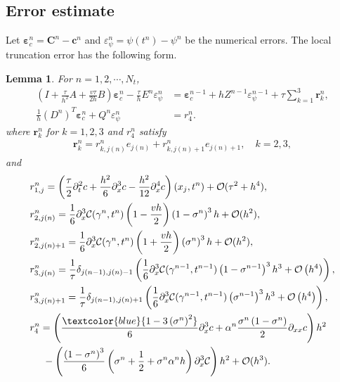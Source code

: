 \documentclass[11pt,reqno]{amsart}
\theoremstyle{plain}
\newtheorem{lemma}[theorem]{Lemma}
\theoremstyle{definition}
\numberwithin{equation}{section}
\newcommand{\paren}[1]{\left(#1\right)}
\newcommand{\p}{\partial}
\newcommand{\mc}[1]{\mathcal{#1}}
\newcommand{\bm}[1]{\boldsymbol{#1}}
\newcommand{\Corr}{\mathcal C}
\begin{document}
\subsection{Error estimate}

Let $\bm \varepsilon_c^n=\bm C^n-\bm c^n$ and $\varepsilon_\psi^n=\psi(t^n)-\psi^n$ be the numerical errors. The local truncation error has the following form.
\begin{lemma}\label{lem:LTE}
For $n=1,2,\cdots,N_t$,
\begin{align}
    \paren{I + \frac{\tau}{h^2}A + \frac{v\tau}{2h}B} \bm \varepsilon_c^n - \frac{\tau}{h} E^n \varepsilon_\psi^n &= \bm \varepsilon_c^{n-1} + h  Z^{n-1}\varepsilon_\psi^{n-1} + \tau \sum_{k=1}^3 \bm r_k^n ,\\
    \frac{1}{h} (D^n)^T \bm \varepsilon_c^n +  Q^n\varepsilon_\psi^n &=  r_4^n.
\end{align}
where $\bm r_k^n$ for $k=1,2,3$ and $r_4^n$  satisfy
\begin{align}
\bm r_k^n = r_{k,j(n)}^n e_{j(n)} + r_{k,j(n)+1}^n e_{j(n)+1} , \quad k = 2,3,
\end{align}
and
\begin{align}
&r_{1,j}^n = \paren{ \frac{\tau}{2}\p_t^2 c + \frac{h^2}{6}\p_x^3 c - \frac{h^2}{12}\p_x^4 c } (x_j,t^n) + \mc O(\tau^2 + h^4),\\
&r_{2,j(n)}^n = \frac{1}{6} \p_x^3 \Corr(\gamma^n,t^n) \paren{1 -\frac{vh}{2}} \paren{1-\sigma^n}^3 h + \mc O(h^2) , \\
&r_{2,j(n)+1}^n = \frac{1}{6}\p_x^3 \Corr(\gamma^n,t^n)\paren{1 + \frac{vh}{2 }} \paren{\sigma^n}^3 h + \mc O(h^2),\\
&r_{3,j(n)}^n = \frac{1}{\tau}\delta_{j(n-1), j(n)-1}\paren{\frac{1}{6} \p_x^3 \Corr(\gamma^{n-1},t^{n-1}) \paren{1-\sigma^{n-1}}^3h^3 + \mc O\paren{ h^4 } }, \\
&r_{3,j(n)+1}^n = \frac{1}{\tau} \delta_{j(n-1),j(n)+1}\paren{\frac{1}{6}  \p_x^3 \Corr(\gamma^{n-1},t^{n-1}) \paren{\sigma^{n-1}}^3h^3  + \mc O\paren{ h^4 } },\\
&r_4^n = \paren{ \frac{\textcolor{blue}{1-3\paren{\sigma^n}^2}}{6} \p_x^3 c +\alpha^n\frac{\sigma^n\paren{1-\sigma^n}}{2} \p_{xx}c } h^2\\
&\quad\ - \paren{ \frac{\paren{1-\sigma^n}^3}{6}  \paren{\sigma^n+\frac{1}{2}+\sigma^n\alpha^nh}\p_x^3 \Corr} h^2 + \mc O(h^3).
\end{align}
\end{lemma}
\end{document}

